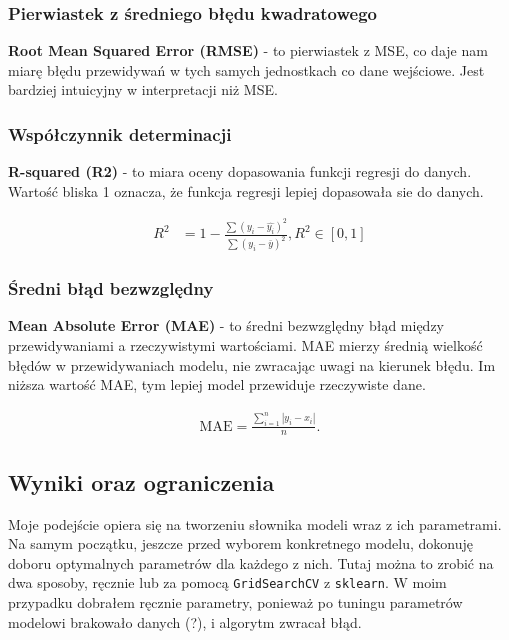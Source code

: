 \documentclass[a4paper]{article}
\begin{document}
\subsubsection{Pierwiastek z średniego błędu kwadratowego}

\quad \textbf{Root Mean Squared Error (RMSE)} - to pierwiastek z MSE, co daje nam miarę błędu przewidywań w tych samych jednostkach co dane wejściowe. Jest bardziej intuicyjny w interpretacji niż MSE.

\subsubsection{Współczynnik determinacji}

\quad \textbf{R-squared (R2)} - to miara oceny dopasowania funkcji regresji do danych. Wartość bliska 1 oznacza, że funkcja regresji lepiej dopasowała sie do danych.

\begin{align} R^2&=1-\frac{\sum({y_i}-\hat{y_i})^2}{\sum(y_i-\bar{y})^2}, R^2 \in [0, 1] \end{align}

\subsubsection{Średni błąd bezwzględny}

\quad \textbf{Mean Absolute Error (MAE)} - to średni bezwzględny błąd między przewidywaniami a rzeczywistymi wartościami. MAE mierzy średnią wielkość błędów w przewidywaniach modelu, nie zwracając uwagi na kierunek błędu. Im niższa wartość MAE, tym lepiej model przewiduje rzeczywiste dane.

\begin{align}
    {\displaystyle \mathrm {MAE} ={\frac {\sum _{i=1}^{n}\left|y_{i}-x_{i}\right|}{n}}.}
\end{align}


\subsection{Wyniki oraz ograniczenia}

\quad Moje podejście opiera się na tworzeniu słownika modeli wraz z ich parametrami. Na samym początku,
jeszcze przed wyborem konkretnego modelu, dokonuję doboru optymalnych parametrów dla
każdego z nich. Tutaj można to zrobić na dwa sposoby, ręcznie lub za pomocą \texttt{GridSearchCV} z \texttt{sklearn}.
W moim przypadku dobrałem ręcznie parametry, ponieważ po tuningu parametrów modelowi brakowało danych (?), i algorytm
zwracał błąd.
\end{document}
